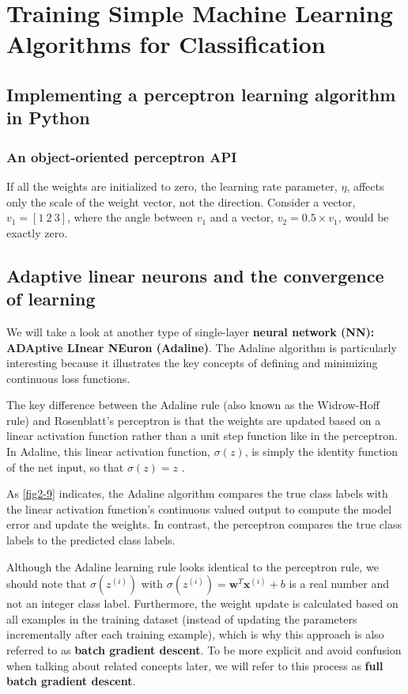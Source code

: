 \chapter{Training Simple Machine Learning Algorithms for Classification\label{Ch02}}
\section{Implementing a perceptron learning algorithm in Python}
\subsection{An object-oriented perceptron API}
If all the weights are initialized to zero, the learning rate parameter, $\eta$, affects only the scale of the weight vector, not the direction. Consider a vector,$v_1 =[1~2~3]$, where the angle between $v_1$ and a vector, $v_2 = 0.5 \times v_1$, would be exactly zero.
\section{Adaptive linear neurons and the convergence of learning}
We will take a look at another type of single-layer \textbf{neural network (NN): ADAptive LInear NEuron (Adaline)}. The Adaline algorithm is particularly interesting because it illustrates the key concepts of defining and minimizing continuous loss functions.

The key difference between the Adaline rule (also known as the Widrow-Hoff rule) and Rosenblatt’s perceptron is that the weights are updated based on a linear activation function rather than a unit step function like in the perceptron. In Adaline, this linear activation function, $\sigma(z)$, is simply the identity function of the net input, so that $\sigma(z)=z$ .


As \autoref{fig2-9} indicates, the Adaline algorithm compares the true class labels with the linear activation function’s continuous valued output to compute the model error and update the weights. In contrast, the perceptron compares the true class labels to the predicted class labels.

Although the Adaline learning rule looks identical to the perceptron rule, we should note that $\sigma(z^{(i)})$ with $\sigma(z^{(i)})=\textbf{w}^T\textbf{x}^{(i)}+b$ is a real number and not an integer class label. Furthermore, the weight update is calculated based on all examples in the training dataset (instead of updating the parameters incrementally after each training example), which is why this approach is also referred to as \textbf{batch gradient descent}. To be more explicit and avoid confusion when talking about related concepts later, we will refer to this process as \textbf{full batch gradient descent}.


